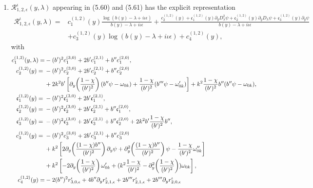 \documentclass[reqno,11pt]{amsart}
\numberwithin{equation}{section}
\numberwithin{equation}{section} %
\begin{document}
\begin{enumerate}
\item $\mathcal{R}_{1,2,\epsilon}^\iota(y,\lambda)$ appearing in (5.60) and (5.61) has the explicit representation
    \begin{equation}\label{ndR12}
        \begin{split}
            \mathcal{R}_{1,2,\epsilon}^{\iota}(y,\lambda)=&c_1^{(1,2)}(y)\frac{\log(b(y)-\lambda+i\iota\epsilon)}{b(y)-\lambda+i\iota\epsilon}+\frac{c_2^{(1,2)}(y)+\mathfrak{c}_1^{(1,2)}(y)\partial_yD_\lambda^2\psi+\mathfrak{c}_2^{(1,2)}(y)\partial_yD_\lambda\psi+\mathfrak{c}_3^{(1,2)}(y)\partial_y\psi}{b(y)-\lambda+i\iota\epsilon} \\
            &+c_3^{(1,2)}(y)\log(b(y)-\lambda+i\iota\epsilon)+c_4^{(1,2)}(y),
        \end{split}
    \end{equation}
with
\begin{align}
  c_1^{(1,2)}(y,\lambda)=&-(b')^2c_1^{(3,0)}+2b'c_1^{(2,1)}+b''c_1^{(2,0)}, \notag\\
c_2^{(1,2)}(y)
={}&-(b')^2c_2^{(3,0)}+2b'c_2^{(2,1)}+b''c_2^{(2,0)} \notag\\
&+2k^2b'\left[\partial_y\!\left(\frac{1-\chi}{(b')^2}\right)(b''\psi-\omega_{0k})
+\frac{1-\chi}{(b')^2}(b'''\psi-\omega_{0k}')\right]
+k^2\frac{1-\chi}{(b')^2}b''(b''\psi-\omega_{0k}), \notag\\
\mathfrak{c}_1^{(1,2)}(y)
={}&-(b')^2\mathfrak{c}_1^{(3,0)}+2b'\mathfrak{c}_1^{(2,1)}, \notag\\
\mathfrak{c}_2^{(1,2)}(y)
={}&-(b')^2\mathfrak{c}_2^{(3,0)}+2b'\mathfrak{c}_2^{(2,1)}
+b''\mathfrak{c}_1^{(2,0)}, \notag\\
\mathfrak{c}_3^{(1,2)}(y)
={}&-(b')^2\mathfrak{c}_3^{(3,0)}+2b'\mathfrak{c}_3^{(2,1)}
+b''\mathfrak{c}_2^{(2,0)}+2k^2b'\frac{1-\chi}{(b')^2}b'', \notag\\
c_3^{(1,2)}(y)
={}&-(b')^2c_3^{(3,0)}+2b'c_3^{(2,1)}+b''c_3^{(2,0)} \notag\\
&+k^2\left[2\partial_y\!\left(\frac{(1-\chi)b''}{(b')^2}\right)\partial_y\psi
+\partial_y^2\!\left(\frac{(1-\chi)b''}{(b')^2}\right)\psi-\frac{1-\chi}{(b')^2}\omega_{0k}''\right] \notag\\
&+k^2\left[-2\partial_y\!\left(\frac{1-\chi}{(b')^2}\right)\omega_{0k}'
+(k^2\frac{1-\chi}{(b')^2}-\partial_y^2\!\left(\frac{1-\chi}{(b')^2}\right))\omega_{0k}\right], \notag\\
c_4^{(1,2)}(y)
=&-2(b'')^2r_{3,0,\epsilon}^{\iota}
+4b''\partial_y r_{2,1,\epsilon}^{\iota}
+2b'''r_{2,1,\epsilon}^{\iota}
+2b'''\partial_y r_{2,0,\epsilon}^{\iota}

\end{align}
\end{enumerate}
\end{document}
